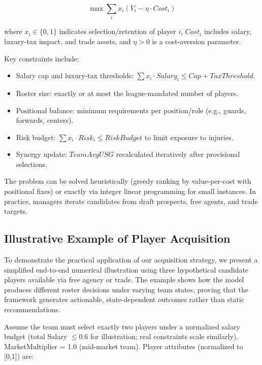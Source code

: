 \documentclass{mcmthesis}
\begin{document}
\[
\max \sum_i x_i \left( V_i - \eta \cdot Cost_i \right)
\]

where $x_i \in \{0,1\}$ indicates selection/retention of player $i$, $Cost_i$ includes salary, luxury-tax impact, and trade assets, and $\eta > 0$ is a cost-aversion parameter.

Key constraints include:
\begin{itemize}
    \item Salary cap and luxury-tax thresholds: $\sum x_i \cdot Salary_i \leq Cap + TaxThreshold$.
    \item Roster size: exactly or at most the league-mandated number of players.
    \item Positional balance: minimum requirements per position/role (e.g., guards, forwards, centers).
    \item Risk budget: $\sum x_i \cdot Risk_i \leq RiskBudget$ to limit exposure to injuries.
    \item Synergy update: $TeamAvgUSG$ recalculated iteratively after provisional selections.
\end{itemize}

The problem can be solved heuristically (greedy ranking by value-per-cost with positional fixes) or exactly via integer linear programming for small instances. In practice, managers iterate candidates from draft prospects, free agents, and trade targets.

\subsection{Illustrative Example of Player Acquisition}
\label{subsec:q2-example}

To demonstrate the practical application of our acquisition strategy, we present a simplified end-to-end numerical illustration using three hypothetical candidate players available via free agency or trade. The example shows how the model produces different roster decisions under varying team states, proving that the framework generates actionable, state-dependent outcomes rather than static recommendations.

Assume the team must select exactly two players under a normalized salary budget (total Salary $\leq 0.6$ for illustration; real constraints scale similarly). MarketMultiplier = 1.0 (mid-market team). Player attributes (normalized to [0,1]) are:
\end{document}
